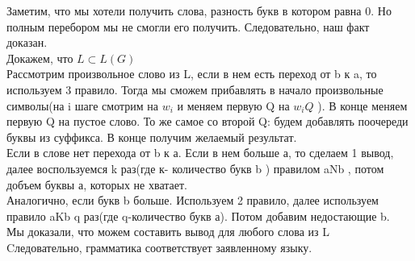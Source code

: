 \documentclass[a4paper,12pt]{article}
\begin{document}
Заметим, что мы хотели получить слова, разность букв в котором равна 0. Но полным перебором мы не смогли его получить. Следовательно, наш факт доказан.\\
Докажем, что $L \subset L(G)$\\
Рассмотрим произвольное слово из L, если в нем есть переход от b к a, то используем 3 правило. Тогда мы сможем прибавлять в начало произвольные символы(на i шаге смотрим на $w_i$ и меняем первую Q на $w_iQ$ ). В конце меняем первую Q на пустое слово. То же самое со второй Q: будем добавлять поочереди буквы из суффикса. В конце получим желаемый результат. \\
Если в слове нет перехода от b к а. Если в нем больше а, то сделаем 1 вывод, далее воспользуемся k раз(где к- количество букв b ) правилом aNb , потом добъем буквы а, которых не хватает.\\
Аналогично, если букв b больше. Используем 2 правило, далее используем правило aKb q раз(где q-количество букв а). Потом добавим недостающие b. \\
Мы доказали, что можем составить вывод для любого слова из L\\
Cледовательно, грамматика соответствует заявленному языку.\\
\end{document}
